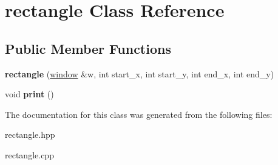 \hypertarget{classrectangle}{}\section{rectangle Class Reference}
\label{classrectangle}
\subsection*{Public Member Functions}
\begin{DoxyCompactItemize}
\item 
{\bfseries rectangle} (\hyperlink{classwindow}{window} \&w, int start\+\_\+x, int start\+\_\+y, int end\+\_\+x, int end\+\_\+y)\hypertarget{classrectangle_a708a8081fa5833bba3950d62e8da1a47}{}\label{classrectangle_a708a8081fa5833bba3950d62e8da1a47}

\item 
void {\bfseries print} ()\hypertarget{classrectangle_a7276bf410c61c6d2654b4ce44022b8ff}{}\label{classrectangle_a7276bf410c61c6d2654b4ce44022b8ff}

\end{DoxyCompactItemize}


The documentation for this class was generated from the following files\+:\begin{DoxyCompactItemize}
\item 
rectangle.\+hpp\item 
rectangle.\+cpp\end{DoxyCompactItemize}

